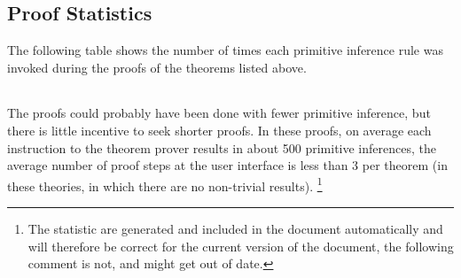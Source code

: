 {
\let\Section\subsection
\let\Subsection\subsubsection
\def\subsection#1{\Subsection*{#1}}

\def\section#1{\Section{#1}\label{t046a}\index{t046a}}


%
}  %

\pagebreak
\subsection{Proof Statistics}

The following table shows the number of times each primitive inference rule was invoked during the proofs of the theorems listed above.

\begin{centering}
\hfill
{\underscoreoff
\begin{tabular}{| l | l |}
\hline

\end{tabular}
}%
\hfill
\end{centering}

The proofs could probably have been done with fewer primitive inference, but there is little incentive to seek shorter proofs.
In these proofs, on average each instruction to the theorem prover results in about 500 primitive inferences, the average number of proof steps at the user interface is less than 3 per theorem (in these theories, in which there are no non-trivial results).
\footnote{The statistic are generated and included in the document automatically and will therefore be correct for the current version of the document, the following comment is not, and might get out of date.}

